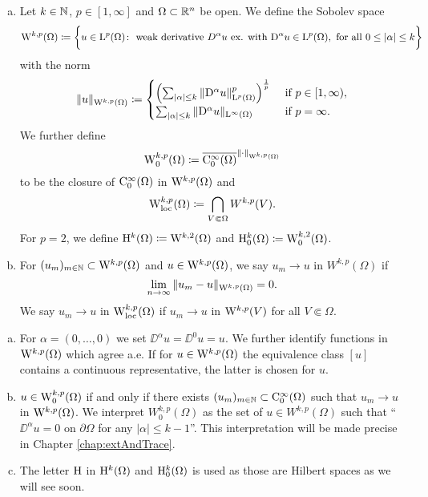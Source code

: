 \begin{defn}
  \begin{enumerate}[a)]
    \item Let $k \in \mathbb{N}$, $p \in [1,\infty]$ and $\Omega \subset \mathbb{R}^n$ be open. 
      We define the Sobolev space
      $$
      \mathrm{W}^{k,p}(\Omega) \coloneqq \bigg\{u \in \mathrm{L}^p(\Omega) \colon \text{ weak derivative } D^\alpha u \text{ ex. with } \mathrm{D}^\alpha u \in \mathrm{L}^p(\Omega), \text{ for all } 0 \leq |\alpha| \leq k \bigg\}
      $$
      with the norm
      $$
      \|u\|_{\mathrm{W}^{k,p}(\Omega)} \coloneqq 
      \begin{cases}
        \left( \sum_{|\alpha| \leq k} \|\mathrm{D}^\alpha u\|_{\mathrm{L}^p(\Omega)}^p \right)^{\frac{1}{p}} &\text{ if } p \in [1,\infty), \\
          \sum_{|\alpha| \leq k} \|\mathrm{D}^\alpha u\|_{\mathrm{L}^\infty(\Omega)} &\text{ if } p = \infty.
      \end{cases}
      $$
      We further define
      $$
      \mathrm{W}_0^{k,p}(\Omega) \coloneqq \overline{\mathrm{C}_0^\infty(\Omega)}^{\|\cdot\|_{\mathrm{W}^{k,p}(\Omega)}}
      $$
      to be the closure of $\mathrm{C}_0^\infty(\Omega)$ in $\mathrm{W}^{k,p}(\Omega)$ and
      $$
      \mathrm{W}_{\operatorname{loc}}^{k,p}(\Omega) \coloneqq \bigcap_{V \Subset \Omega} W^{k,p}(V).
      $$
      For $p = 2$, we define $\mathrm{H}^k(\Omega) \coloneqq \mathrm{W}^{k,2}(\Omega)$ and $\mathrm{H}_0^k(\Omega) \coloneqq \mathrm{W}_0^{k,2}(\Omega)$.
    \item For $(u_m)_{m \in \mathbb{N}} \subset \mathrm{W}^{k,p}(\Omega)$ and $u \in \mathrm{W}^{k,p}(\Omega)$, we say $u_m \to u$ in $W^{k,p}(\Omega)$ if $$\lim_{n \to \infty} \|u_m - u\|_{\mathrm{W}^{k,p}(\Omega)} = 0.$$  
      We say $u_m \to u$ in $\mathrm{W}_{\operatorname{loc}}^{k,p}(\Omega)$ if $u_m \to u$ in $\mathrm{W}^{k,p}(V)$ for all $V \Subset \Omega$.
  \end{enumerate}
\end{defn}

\begin{rem}
  \begin{enumerate}[a)]
    \item For $\alpha = (0,\dots,0)$ we set $\DD^\alpha u = \DD^0 u = u$.
      We further identify functions in $\mathrm{W}^{k,p}(\Omega)$ which agree a.e.
      If for $u \in \mathrm{W}^{k,p}(\Omega)$ the equivalence class $[u]$ contains a continuous representative, the latter is chosen for $u$.
    \item $u \in \mathrm{W}_0^{k,p}(\Omega)$ if and only if there exists $(u_m)_{m \in \mathbb{N}} \subset \mathrm{C}_0^\infty(\Omega)$ such that $u_m \to u$ in $\mathrm{W}^{k,p}(\Omega)$.
      We interpret $W_0^{k,p}(\Omega)$ as the set of $u \in W^{k,p}(\Omega)$ such that ``$\DD^\alpha u = 0$ on $\partial \Omega$ for any $|\alpha| \leq k - 1$''.
      This interpretation will be made precise in Chapter \ref{chap:extAndTrace}.
    \item The letter $\mathrm{H}$ in $\mathrm{H}^k(\Omega)$ and $\mathrm{H}_0^k(\Omega)$ is used as those are Hilbert spaces as we will see soon.
  \end{enumerate}
\end{rem}

